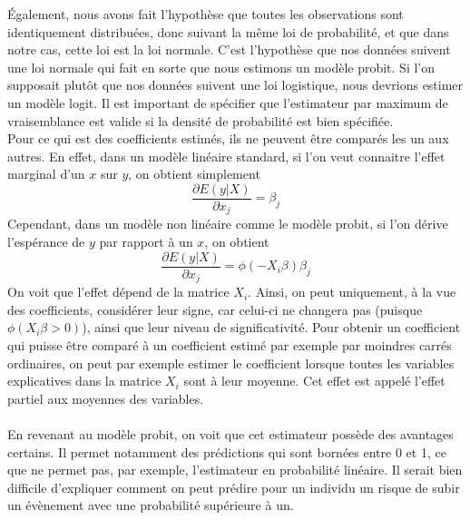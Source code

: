 \documentclass[a4paper, oneside, titlepage]{article}
\begin{document}
Également, nous avons fait l'hypothèse que toutes les observations sont identiquement distribuées, donc suivant la même loi de probabilité, et que dans notre cas, cette loi est la loi normale. C'est l'hypothèse que nos données suivent une loi normale qui fait en sorte que nous estimons un modèle probit. Si l'on supposait plutôt que nos données suivent une loi logistique, nous devrions estimer un modèle logit. Il est important de spécifier que l'estimateur par maximum de vraisemblance est valide si la densité de probabilité est bien spécifiée.
\\
Pour ce qui est des coefficients estimés, ils ne peuvent être comparés les un aux autres. En effet, dans un modèle linéaire standard, si l'on veut connaitre l'effet marginal d'un $x$ sur $y$, on obtient simplement
\[\frac{\partial E(y|X)}{\partial x_j}=\beta_j\]
Cependant, dans un modèle non linéaire comme le modèle probit, si l'on dérive l'espérance de $y$ par rapport à un $x$, on obtient
\[\frac{\partial E(y|X)}{\partial x_j}=\phi(-X_i\beta)\beta_j\]
On voit que l'effet dépend de la matrice $X_i$. Ainsi, on peut uniquement, à la vue des coefficients, considérer leur signe, car celui-ci ne changera pas (puisque $\phi(X_i\beta>0)$), ainsi que leur niveau de significativité. Pour obtenir un coefficient qui puisse être comparé à un coefficient estimé par exemple par moindres carrés ordinaires, on peut par exemple estimer le coefficient lorsque toutes les variables explicatives dans la matrice $X_i$ sont à leur moyenne. Cet effet est appelé l'effet partiel aux moyennes des variables.
\\
\\
En revenant au modèle probit, on voit que cet estimateur possède des avantages certains. Il permet notamment des prédictions qui sont bornées entre 0 et 1, ce que ne permet pas, par exemple, l'estimateur en probabilité linéaire. Il serait bien difficile d'expliquer comment on peut prédire pour un individu un risque de subir un évènement avec une probabilité supérieure à un.
\end{document}
